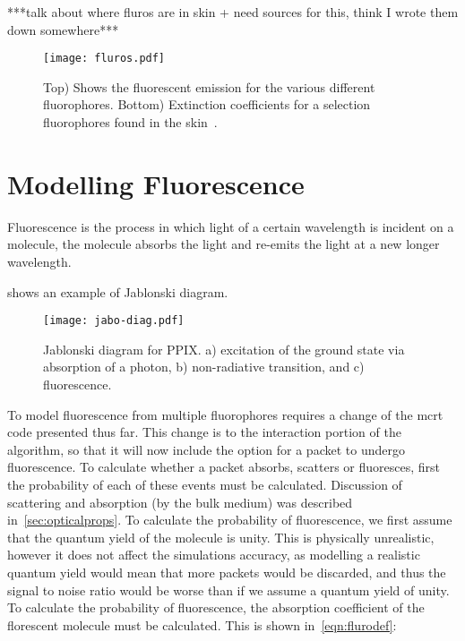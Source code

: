 ***talk about where fluros are in skin + need sources for this, think I wrote them down somewhere***


\begin{figure}[!htbp]
  \centering
  \texttt{[image: fluros.pdf]}
  \caption{Top) Shows the fluorescent emission for the various different fluorophores. Bottom) Extinction coefficients for a selection fluorophores found in the skin~\cite{prahltyro,prahltryto,soltani2019deep,sun2012biomarkers,islam2013ph,evans2013magnetic,von2012fluorescence}.}
  \label{fig:flurosshow}
\end{figure}
\FloatBarrier

\section{Modelling Fluorescence}

Fluorescence is the process in which light of a certain wavelength is incident on a molecule, the molecule absorbs the light and re-emits the light at a new longer wavelength.

 shows an example of Jablonski diagram.

\begin{figure}[!htpb]
	\centering
	\texttt{[image: jabo-diag.pdf]}
	\caption{Jablonski diagram for PPIX. a) excitation of the ground state via absorption of a photon, b) non-radiative transition, and c) fluorescence.}
	\label{fig:Jabo}
\end{figure}

To model fluorescence from multiple fluorophores requires a change of the \gls*{mcrt} code presented thus far.
This change is to the interaction portion of the algorithm, so that it will now include the option for a packet to undergo fluorescence.
To calculate whether a packet absorbs, scatters or fluoresces, first the probability of each of these events must be calculated.
Discussion of scattering and absorption (by the bulk medium) was described in~\cref{sec:opticalprops}.
To calculate the probability of fluorescence, we first assume that the quantum yield of the molecule is unity.
This is physically unrealistic, however it does not affect the simulations accuracy, as modelling a realistic quantum yield would mean that more packets would be discarded, and thus the signal to noise ratio would be worse than if we assume a quantum yield of unity.
To calculate the probability of fluorescence, the absorption coefficient of the florescent molecule must be calculated.
This is shown in~\cref{eqn:flurodef}:

